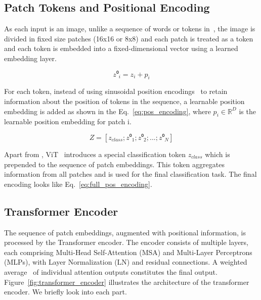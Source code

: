 \subsection{Patch Tokens and Positional Encoding}

As each input is an image, unlike a sequence of words or tokens in~\cite{vaswani2023attentionneed}, the image is divided in fixed size patches (16x16 or 8x8) and each patch is treated as a token and each token is embedded into a fixed-dimensional vector using a learned embedding layer.

\begin{equation}
	\label{eq:pos_encoding}
	z⁰_i = z_i + p_i
\end{equation} 

For each token, instead of using sinusoidal position encodings~\cite{vaswani2023attentionneed} to retain information about the position of tokens in the sequence, a learnable position embedding is added as shown in the Eq.~\ref{eq:pos_encoding}, where \(p_i \in \mathbb{R}^{D}\) is the learnable position embedding for patch i. 

\begin{equation}
	\label{eq:full_pos_encoding}
	Z = [z_{class}; z⁰_1; z⁰_2;...; z⁰_N]
\end{equation}

Apart from \cite{vaswani2023attentionneed}, ViT~\cite{dosovitskiy2020image} introduces a special classification token \(z_{class}\) which is prepended to the sequence of patch embeddings. This token aggregates information from all patches and is used for the final classification task. The final encoding looks like Eq.~\ref{eq:full_pos_encoding}.

\subsection{Transformer Encoder}
The sequence of patch embeddings, augmented with positional information, is processed by the Transformer encoder. The encoder consists of multiple layers, each comprising Multi-Head Self-Attention (MSA) and Multi-Layer Perceptrons (MLPs), with Layer Normalization (LN) and residual connections. A weighted average~\cite{weng2020transformer} of individual attention outputs constitutes the final output. Figure~\ref{fig:transformer_encoder} illustrates the architecture of the transformer encoder. We briefly look into each part.


